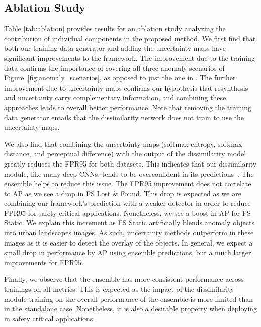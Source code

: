 \documentclass[final]{cvpr}
\begin{document}
\subsection{Ablation Study}
\label{dis:ablation}
Table \ref{tab:ablation} provides results for an ablation study analyzing the contribution of individual components in the proposed method. 
We first find that both our training data generator and adding the uncertainty maps have significant improvements to the framework. The improvement due to the training data confirms the importance of covering all three anomaly scenarios of Figure~\ref{fig:anomaly_scenarios}, as opposed to just the one in \cite{epfl}. The further improvement due to uncertainty maps confirms our hypothesis that resynthesis and uncertainty carry complementary information, and combining these approaches leads to overall better performance. 
Note that removing the training data generator entails that the dissimilarity network does not train to use the uncertainty maps. 

We also find that combining the uncertainty maps (softmax entropy, softmax distance, and perceptual difference) with the output of the dissimilarity model greatly reduces the FPR95 for both datasets. This indicates that our dissimilarity module, like many deep CNNs, tends to be overconfident in its predictions~\cite{Calibration}. The ensemble helps to reduce this issue.
The FPR95 improvement does not correlate to AP as we see a drop in FS Lost \& Found. This drop is expected as we are combining our framework's prediction with a weaker detector in order to reduce FPR95 for safety-critical applications. Nonetheless, we see a boost in AP for FS Static. We explain this increment as FS Static artificially blends anomaly objects into urban landscapes images. As such, uncertainty methods outperform in these images as it is easier to detect the overlay of the objects.
In general, we expect a small drop in performance by AP using ensemble predictions, but a much larger improvements for FPR95. 

Finally, we observe that the ensemble has more consistent performance across trainings on all metrics.
This is expected as the impact of the dissimilarity module training on the overall performance of the ensemble is more limited than in the standalone case. Nonetheless, it is also a desirable property when deploying in safety critical applications.
\end{document}
